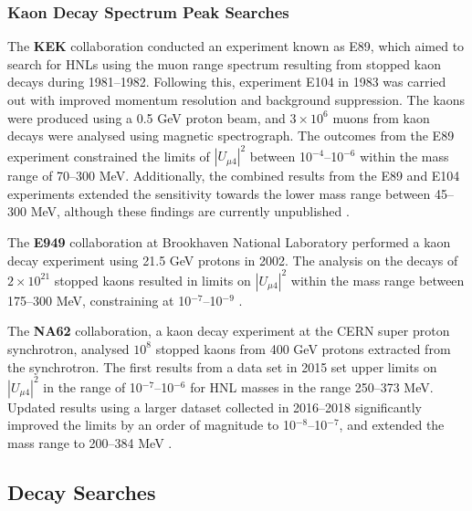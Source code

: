 \subsubsection{Kaon Decay Spectrum Peak Searches}

\begin{coloritemize}
\item The \textbf{KEK} collaboration conducted an experiment known as E89, which aimed to search for HNLs using the muon range spectrum resulting from stopped kaon decays during 1981--1982. 
Following this, experiment E104 in 1983 was carried out with improved momentum resolution and background suppression.
The kaons were produced using a 0.5 GeV proton beam, and $3 \times 10^{6}$ muons from kaon decays were analysed using magnetic spectrograph.
The outcomes from the E89 experiment constrained the limits of $|U_{\mu4}|^{2}$ between 10$^{-4}$--10$^{-6}$ within the mass range of 70--300 MeV.
Additionally, the combined results from the E89 and E104 experiments extended the sensitivity towards the lower mass range between 45--300 MeV, although these findings are currently unpublished \cite{KEK1, KEK2, KEK3}.

\item The \textbf{E949} collaboration at Brookhaven National Laboratory performed a kaon decay experiment using 21.5 GeV protons in 2002.
The analysis on the decays of $2 \times 10^{21}$ stopped kaons resulted in limits on $|U_{\mu4}|^{2}$  within the mass range between 175--300 MeV, constraining at 10$^{-7}$--10$^{-9}$ \cite{E949}.

\item The \textbf{NA62} collaboration, a kaon decay experiment at the CERN super proton synchrotron, analysed $10^{8}$ stopped kaons from 400 GeV protons extracted from the synchrotron.
The first results from a data set in 2015 set upper limits on $|U_{\mu4}|^{2}$ in the range of 10$^{-7}$--10$^{-6}$ for HNL masses in the range 250--373 MeV.
Updated results using a larger dataset collected in 2016--2018 significantly improved the limits by an order of magnitude to 10$^{-8}$--10$^{-7}$, and extended the mass range to 200--384 MeV \cite{NA62A, NA62B}.
\end{coloritemize}

\subsection{Decay Searches}

